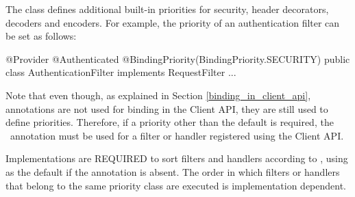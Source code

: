 The  class defines additional built-in priorities for security, header decorators, decoders and encoders. For example, the priority of an authentication filter can be set as follows:

\begin{listing}{1}
@Provider
@Authenticated
@BindingPriority(BindingPriority.SECURITY)
public class AuthenticationFilter implements RequestFilter {
    ...
}
\end{listing}

Note that even though, as explained in Section \ref{binding_in_client_api}, annotations are not used for binding in the Client API, they are still used to define priorities. Therefore, if a priority other than the default is required, the \BindingPriority\ annotation must be used for a filter or handler registered using the Client API. 

Implementations are REQUIRED to sort filters and handlers according to , using  as the default if the annotation is absent. The order in which filters or handlers that belong to the same priority class are executed is implementation dependent.



